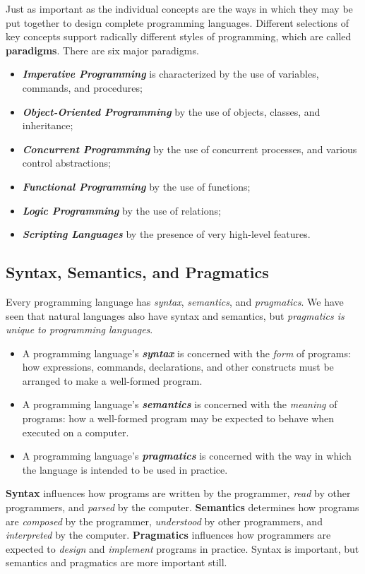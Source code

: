 \documentclass{article}
\begin{document}
Just as important as the individual concepts are the ways in which they may be put together to design complete programming languages. Different selections of key concepts support radically different styles of programming, which are called \textbf{paradigms}. There are six major paradigms.
\begin{itemize}
    \item \textit{\textbf{Imperative Programming}} is characterized by the use of variables, commands, and procedures;
    \item \textit{\textbf{Object-Oriented Programming}} by the use of objects, classes, and inheritance;
    \item \textit{\textbf{Concurrent Programming}} by the use of concurrent processes, and various control abstractions;
    \item \textit{\textbf{Functional Programming}} by the use of functions; \item \textit{\textbf{Logic Programming}} by the use of relations;
    \item \textit{\textbf{Scripting Languages}} by the presence of very high-level features. 
\end{itemize}

\subsection{Syntax, Semantics, and Pragmatics}

Every programming language has \textit{syntax}, \textit{semantics}, and \textit{pragmatics}. We have seen that natural languages also have syntax and semantics, but \textit{pragmatics is unique to programming languages}.
\begin{itemize}
    \item A programming language’s \textbf{\textit{syntax}} is concerned with the \textit{form} of programs: how expressions, commands, declarations, and other constructs must be arranged to make a well-formed program.
    \item A programming language’s \textbf{\textit{semantics}} is concerned with the \textit{meaning} of programs: how a well-formed program may be expected to behave when executed on a computer.
    \item A programming language’s \textbf{\textit{pragmatics}} is concerned with the way in which the language is intended to be used in practice.
\end{itemize}

\textbf{Syntax} influences how programs are written by the programmer, \textit{read} by other programmers, and \textit{parsed} by the computer. \textbf{Semantics} determines how programs are \textit{composed} by the programmer, \textit{understood} by other programmers, and \textit{interpreted} by the computer. \textbf{Pragmatics} influences how programmers are expected to \textit{design} and \textit{implement} programs in practice. Syntax is important, but semantics and pragmatics are more important still.
\end{document}
